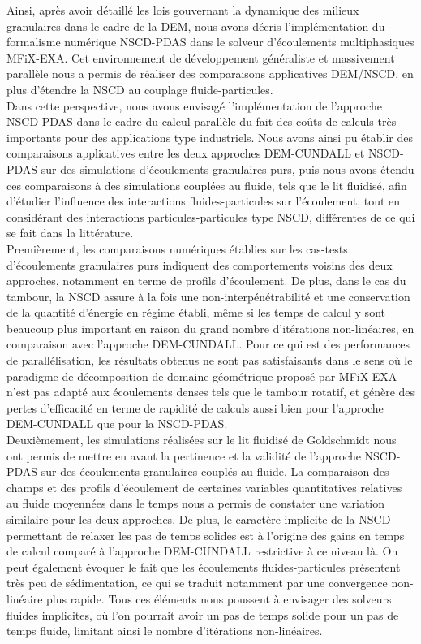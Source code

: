 Ainsi, après avoir détaillé les lois gouvernant la dynamique des milieux granulaires dans le cadre de la DEM, nous avons décris l'implémentation du formalisme numérique NSCD-PDAS dans le solveur d'écoulements multiphasiques MFiX-EXA. Cet environnement de développement généraliste et massivement parallèle nous a permis de réaliser des comparaisons applicatives DEM/NSCD, en plus d'étendre la NSCD au couplage fluide-particules.\\
Dans cette perspective, nous avons envisagé l'implémentation de l'approche NSCD-PDAS dans le cadre du calcul parallèle du fait des coûts de calculs très importants pour des applications type industriels. Nous avons ainsi pu établir des comparaisons applicatives entre les deux approches DEM-CUNDALL et NSCD-PDAS sur des simulations d'écoulements granulaires purs, puis nous avons étendu ces comparaisons à des simulations couplées au fluide, tels que le lit fluidisé, afin d'étudier l'influence des interactions fluides-particules sur l'écoulement, tout en considérant des interactions particules-particules type NSCD, différentes de ce qui se fait dans la littérature.\\ 

Premièrement, les comparaisons numériques établies sur les cas-tests d'écoulements granulaires purs indiquent des comportements voisins des deux approches, notamment en terme de profils d'écoulement. De plus, dans le cas du tambour, la NSCD assure à la fois une non-interpénétrabilité et une conservation de la quantité d’énergie en régime établi, même si les temps de calcul y sont beaucoup plus important en raison du grand nombre d'itérations non-linéaires, en comparaison avec l’approche DEM-CUNDALL. Pour ce qui est des performances de parallélisation, les résultats obtenus ne sont pas satisfaisants dans le sens où le paradigme de décomposition de domaine géométrique proposé par MFiX-EXA n'est pas adapté aux écoulements denses tels que le tambour rotatif, et génère des pertes d'efficacité en terme de rapidité de calculs aussi bien pour l'approche DEM-CUNDALL que pour la NSCD-PDAS.\\

Deuxièmement, les simulations réalisées sur le lit fluidisé de Goldschmidt nous ont permis de mettre en avant la pertinence et la validité de l'approche NSCD-PDAS sur des écoulements granulaires couplés au fluide. 
La comparaison des champs et des profils d'écoulement de certaines variables quantitatives relatives au fluide moyennées dans le temps nous a permis de constater une variation similaire pour les deux approches. De plus, le caractère implicite de la NSCD permettant de relaxer les pas de temps solides est à l'origine des gains en temps de calcul comparé à l'approche DEM-CUNDALL restrictive à ce niveau là. On peut également évoquer le fait que les écoulements fluides-particules présentent très peu de sédimentation, ce qui se traduit notamment par une convergence non-linéaire plus rapide. Tous ces éléments nous poussent à envisager des solveurs fluides implicites, où l'on pourrait avoir un pas de temps solide pour un pas de temps fluide, limitant ainsi le nombre d'itérations non-linéaires.